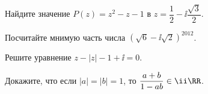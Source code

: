 %
%



\begin{problems}

\item
Найдите значение $P(z) = z^2 - z - 1$ в
$z = \dfrac{1}{2} - \ii \dfrac{\sqrt{3}}{2}$.

\item
Посчитайте мнимую часть числа
$\left(\sqrt{6} - \ii \sqrt{2}\right)^{2012}$.

\item
Решите уравнение
$z - |z| - 1 + \ii = 0$.

\item
Докажите, что если
$|a| = |b| = 1$,
то
$\dfrac{a + b}{1 - a b} \in \ii \RR$.

\end{problems}


